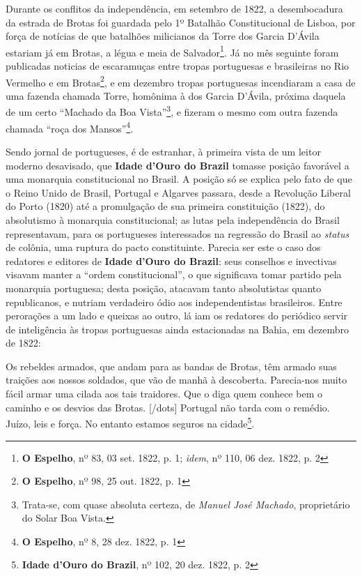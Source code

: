 Durante os conflitos da independência, em setembro de 1822, a desembocadura da estrada de Brotas foi guardada pelo 1º Batalhão Constitucional de Lisboa, por força de notícias de que batalhões milicianos da Torre dos Garcia D'Ávila estariam já em Brotas, a légua e meia de Salvador\footnote{\textbf{O Espelho}, nº 83, 03 set. 1822, p. 1; \textit{idem}, nº 110, 06 dez. 1822, p. 2}. Já no mês seguinte foram publicadas noticias de escaramuças entre tropas portuguesas e brasileiras no Rio Vermelho e em Brotas\footnote{\textbf{O Espelho}, nº 98, 25 out. 1822, p. 1}, e em dezembro tropas portuguesas incendiaram a casa de uma fazenda chamada Torre, homônima à dos Garcia D'Ávila, próxima daquela de um certo ``Machado da Boa Vista''\footnote{Trata-se, com quase absoluta certeza, de \textit{Manuel José Machado}, proprietário do Solar Boa Vista.}, e fizeram o mesmo com outra fazenda chamada ``roça dos Mansos''\footnote{\textbf{O Espelho}, nº 8, 28 dez. 1822, p. 1}.

Sendo jornal de portugueses, é de estranhar, à primeira vista de um leitor moderno desavisado, que \textbf{Idade d'Ouro do Brazil} tomasse posição favorável a uma monarquia constitucional no Brasil. A posição só se explica pelo fato de que o Reino Unido de Brasil, Portugal e Algarves passara, desde a Revolução Liberal do Porto (1820) até a promulgação de sua primeira constituição (1822), do absolutismo à monarquia constitucional; as lutas pela independência do Brasil representavam, para os portugueses interessados na regressão do Brasil ao \textit{status} de colônia, uma ruptura do pacto constituinte. Parecia ser este o caso dos redatores e editores de \textbf{Idade d'Ouro do Brazil}: seus conselhos e invectivas visavam manter a ``ordem constitucional'', o que significava tomar partido pela monarquia portuguesa; desta posição, atacavam tanto absolutistas quanto republicanos, e nutriam verdadeiro ódio aos independentistas brasileiros. Entre perorações a um lado e queixas ao outro, lá iam os redatores do periódico servir de inteligência às tropas portuguesas ainda estacionadas na Bahia, em dezembro de 1822:

\begin{citacao}
Os rebeldes armados, que andam para as bandas de Brotas, têm armado suas traições aos nossos soldados, que vão de manhã à descoberta. Parecia-nos muito fácil armar uma cilada aos tais traidores. Que o diga quem conhece bem o caminho e os desvios das Brotas. [/dots] Portugal não tarda com o remédio. Juízo, leis e força. No entanto estamos seguros na cidade\footnote{\textbf{Idade d'Ouro do Brazil}, nº 102, 20 dez. 1822, p. 2}.
\end{citacao}

